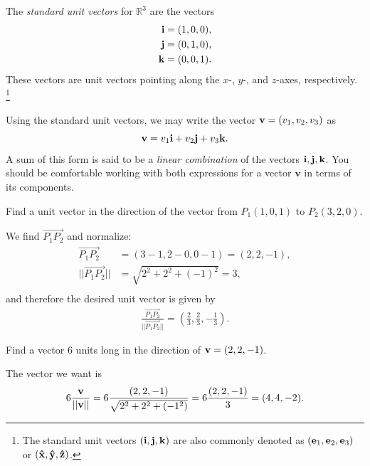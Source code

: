 \documentclass[12pt,letterpaper,reqno]{article}
\numberwithin{equation}{section}
\newcommand{\ti}[1]{\textit{#1}}
\begin{document}
\begin{defn}
	 The \ti{standard unit vectors} for $\mathbb{R}^3$ are the vectors
	\begin{align*}
		{\bf i}&=(1,0,0), \\
		{\bf j}&=(0,1,0), \\
		{\bf k}&=(0,0,1). \\
	\end{align*}
These vectors are unit vectors pointing along the $x$-, $y$-, and $z$-axes, respectively. \footnote{The standard unit vectors $({\bf i},{\bf j},{\bf k})$ are also commonly denoted as $({\bf e}_1, {\bf e}_2, {\bf e}_3)$ or $({\bf \hat{x}}, {\bf \hat{y}}, {\bf \hat{z}})$.}	
\end{defn}
Using the standard unit vectors, we may write the vector ${\bf v}=(v_1,v_2,v_3)$ as $${\bf v}=v_1{\bf i}+v_2{\bf j}+v_3{\bf k}.$$
A sum of this form is said to be a \emph{linear combination} of the vectors ${\bf i},{\bf j},{\bf k}$. You should be comfortable working with both expressions for a vector $\mathbf{v}$ in terms of its components.

\begin{example}
Find a unit vector in the direction of the vector from $P_1(1,0,1)$ to $P_2(3,2,0)$.
\end{example}

{\color{red} 
We find $\overrightarrow{P_1P_2}$ and normalize:
\begin{align*}
	\overrightarrow{P_1P_2}&=(3-1,2-0,0-1)=(2,2,-1), \\
	||\overrightarrow{P_1P_2}||&=\sqrt{2^2+2^2+(-1)^2}=3, \\
\end{align*}
and therefore the desired unit vector is given by
\begin{align*}
	\frac{\overrightarrow{P_1P_2}}{||\overrightarrow{P_1P_2}||}=(\frac{2}{3},\frac{2}{3},-\frac{1}{3}).
\end{align*}}

\begin{example}
Find a vector 6 units long in the direction of ${\bf v}=(2,2,-1)$.	
\end{example}

{\color{red} 
The vector we want is 
\begin{align*}
6\frac{{\bf v}}{||{\bf v}||}=6\frac{(2,2,-1)}{\sqrt{2^2+2^2+(-1^2)}}=6\frac{(2,2,-1)}{3}=(4,4,-2).	
\end{align*}
}
\end{document}
